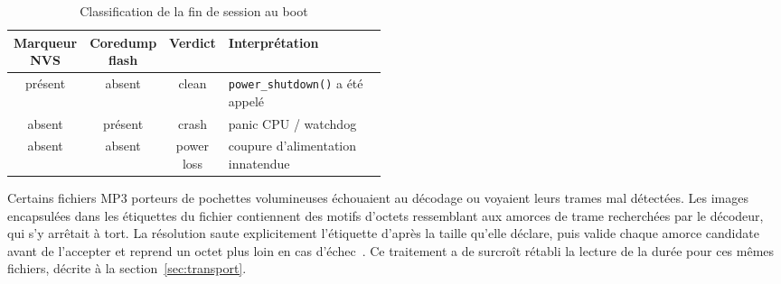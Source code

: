 \begin{table}[H]
    \centering
    \caption{Classification de la fin de session au boot}
    \label{tab:verdict_extinction}
    {\renewcommand{\arraystretch}{1.1}
        \setlength{\tabcolsep}{4pt}
        \begin{tabular}{@{}c c c >{\raggedright\arraybackslash}p{0.48\linewidth}@{}}
            \hline
            Marqueur NVS & Coredump flash & Verdict    & Interprétation                          \\
            \hline
            présent      & absent         & clean      & \texttt{power\_shutdown()} a été appelé \\
            absent       & présent        & crash      & panic CPU / watchdog                    \\
            absent       & absent         & power loss & coupure d'alimentation innatendue       \\
            \hline
        \end{tabular}}
\end{table}


Certains fichiers MP3 porteurs de pochettes volumineuses échouaient au décodage ou voyaient leurs trames mal détectées. Les images encapsulées dans les étiquettes du fichier contiennent des motifs d'octets ressemblant aux amorces de trame recherchées par le décodeur, qui s'y arrêtait à tort. La résolution saute explicitement l'étiquette d'après la taille qu'elle déclare, puis valide chaque amorce candidate avant de l'accepter et reprend un octet plus loin en cas d'échec~\cite{helix_mp3_decoder}. Ce traitement a de surcroît rétabli la lecture de la durée pour ces mêmes fichiers, décrite à la section~\ref{sec:transport}.